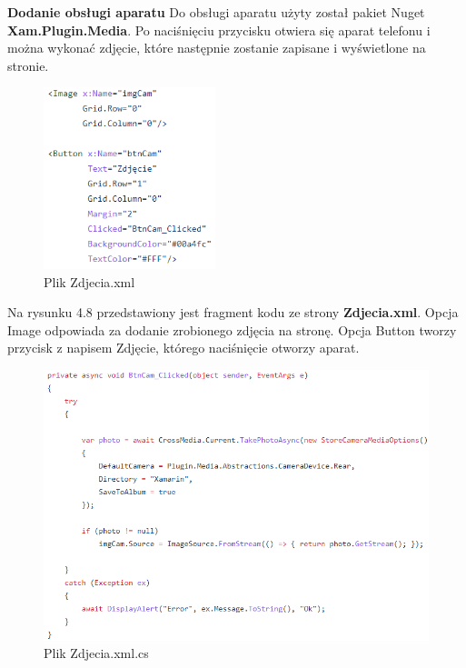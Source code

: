\textbf{Dodanie obsługi aparatu} \newline
Do obsługi aparatu użyty został pakiet Nuget \textbf{Xam.Plugin.Media}. Po naciśnięciu przycisku otwiera się aparat telefonu i można wykonać zdjęcie, które następnie zostanie zapisane i wyświetlone na stronie.
\newline
\begin{figure}[!htb]
	\begin{center}
		\includegraphics[width=5cm]{rys/Zdjecia_xaml.png}
		\caption{Plik Zdjecia.xml}
		\label{rys:rysunek019}
	\end{center}
\end{figure}
\newline
Na rysunku 4.8 przedstawiony jest fragment kodu ze strony \textbf{Zdjecia.xml}. Opcja Image odpowiada za dodanie zrobionego zdjęcia na stronę. Opcja Button tworzy przycisk z napisem Zdjęcie, którego naciśnięcie otworzy aparat.

\begin{figure}[!htb]
	\begin{center}
		\includegraphics[width=12cm]{rys/Zdjecia_xaml_cs.png}
		\caption{Plik Zdjecia.xml.cs}
		\label{rys:rysunek020}
	\end{center}
\end{figure}

